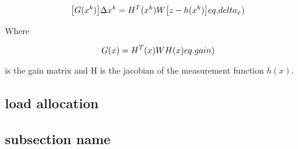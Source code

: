 \begin{equation}
  \big[G(x^{k})\big]\Delta x^{k} = H^{T}(x^{k})W \big[ z-h(x^{k}) \big]
  \label(eq.delta_x)
\end{equation}

Where

\begin{equation}
  G(x)=H^{T}(x)WH(x)
  \label(eq.gain)
\end{equation}

is the gain matrix and H is the jacobian of the measurement function $h(x)$.
\subsection{load allocation}

\subsection{subsection name}
